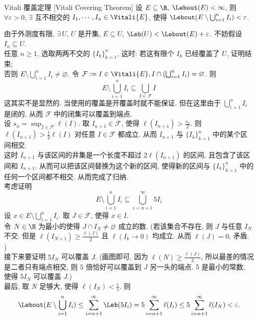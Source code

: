 \begin{thm}
    {Vitali 覆盖定理}
    [Vitali Covering Theorem]
    设 \(E\subseteq\R\), \(\Lebout(E)<\infty\), 则 \(\forall\varepsilon>0\), \(\exists\) 互不相交的 \(I_1,\cdots,I_n\in\Vitali{E}\), 使得 \(\Lebout(E\setminus\bigcup_{i=1}^n I_i)<\varepsilon\).
\end{thm}
\begin{prf}
    由于外测度有限, \(\exists\,U\), \(U\) 是开集, \(E\subseteq U\), \(\Leb(U)<\Lebout(E)+\varepsilon\). 不妨假设 \(I_n\subseteq U\). \\
    任意 \(n\geq 1\), 选取两两不交的 \(\{I_k\}_{k=1}^n\), 这时: 若这有限个 \(I_k\) 已经覆盖了 \(U\), 证明结束;\\
    否则 \(E\setminus\bigcup_{i=1}^n I_i\neq\varnothing\). 令 \(\mathcal{F}:={I\in\Vitali{E},I\cap(\bigcup_{i=1}^n I_i)=\varnothing}\). 则
    \[E\setminus\bigcup_{i=1}^n I_i\subseteq\bigcup_{I\in\mathcal{F}} I\]
    \textsf{这其实不是显然的. 当使用的覆盖是开覆盖时就不能保证. 但在这里由于 \(\bigcup_{i=1}^n I_i\) 是闭的, 从而 \(\mathcal{F}\) 中的闭集可以覆盖到端点.} \\
    设 \(s_n=\sup_{I\in\mathcal{F}}\ell(I)\). 取 \(I_{n+1}\in\mathcal{F}\), 使得 \(\ell(I_{n+1})>\frac{s_n}{2}\). 则 \(\ell(I_{n+1})>\frac{1}{2}\ell(I)\) 对任意 \(I\in\mathcal{F}\) 都成立. 从而 \(I_{n+1}\) 与 \(\{I_k\}_{k=1}^n\) 中的某个区间相交. \\
    这时 \(I_{n+1}\) 与该区间的并集是一个长度不超过 \(2\ell(I_{n+1})\) 的区间, 且包含了该区间和 \(I_{n+1}\). 从而可以把该区间替换为这个新的区间, 使得新的区间与 \(\{I_k\}_{k=1}^n\) 中的任何一个区间都不相交. 从而完成了归纳. \\
    考虑证明
    \[E\setminus\bigcup_{i=1}^n I_i\subseteq\bigcup_{i=n+1}^\infty 5I_i\]
    设 \(x\in E\setminus\bigcup_{i=1}^n I_i\). 取 \(J\in\mathcal{F}\), 使得 \(x\in I\). \\
    令 \(N\in\N\) 为最小的使得 \(J\cap I_N\neq\varnothing\) 成立的数. (若该集合不存在, 则 \(J\) 与任意 \(I_N\) 不交. 但是 \(\ell(I_{N+1})\geq\frac{\ell(J)}{2}\) 且 \(\ell(I_k\to 0)\) 均成立. 从而 \(\ell(J)=0\), 矛盾. )\\
    接下来要证明 \(5I_N\) 可以覆盖 \(J\). (画图即可, 因为 \(\ell(N)\geq\frac{\ell(J)}{2}\), 所以最差的情况是二者只有端点相交, 则 \(5\) 倍恰好可以覆盖到 \(J\) 另一头的端点. 5 是最小的常数, 使得 \(5I_N\) 可以覆盖 \(J\).)\\
    最后, 取 \(N\) 足够大, 使得 \(\ell(I_N)<\frac{\varepsilon}{5}\). 则
    \[\Lebout(E\setminus\bigcup_{i=1}^n I_i)\leq\sum_{i=n+1}^\infty \Leb(5I_i)=5\sum_{i=n+1}^\infty \ell(I_i)\leq 5\sum_{i=n+1}^\infty \ell(I_N)<\varepsilon.\]
\end{prf}
